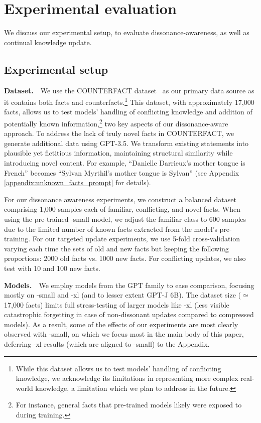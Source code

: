 \section{Experimental evaluation}\label{sec:experiments}
We discuss our experimental setup, to evaluate dissonance-awareness, as well as continual knowledge update.

\subsection{Experimental setup}\label{sec:models_and_data}

\textbf{Dataset.}\ \ 
We use the COUNTERFACT dataset~\citep{meng2022locating} as our primary data source as it contains both facts and counterfacts.\footnote{While this dataset allows us to test models' handling of conflicting knowledge, we acknowledge its limitations in representing more complex real-world knowledge, a limitation which we plan to address in the future.}
This dataset, with approximately 17,000 facts, allows us to test models' handling of conflicting knowledge and addition of potentially known information,\footnote{For instance,  general facts that pre-trained models likely were exposed to during  training.} two key aspects of our dissonance-aware approach. To address the lack of truly novel facts in COUNTERFACT, we generate additional data using GPT-3.5. We transform existing statements into plausible yet fictitious information, maintaining structural similarity while introducing novel content. For example, ``Danielle Darrieux's mother tongue is French'' becomes ``Sylvan Myrthil's mother tongue is Sylvan'' (see Appendix \ref{appendix:unknown_facts_prompt} for details).

For our dissonance awareness experiments, we construct a balanced dataset comprising 1,000 samples each of familiar, conflicting, and novel facts. When using the pre-trained \gpttwo-small model, we adjust the familiar class to 600 samples due to the limited number of known facts extracted from the model's pre-training. 
For our targeted update experiments, we use 5-fold cross-validation varying each time the sets of old and new facts but keeping the following proportions: 2000 old facts vs. 1000 new facts. For conflicting updates, we also test with 10 and 100 new facts. 

\textbf{Models.}\ \ We employ models from the GPT family to ease comparison, focusing mostly on \gpttwo-small and \gpttwo-xl (and to lesser extent GPT-J 6B). The dataset size ($\simeq$17,000 facts) limits full stress-testing of larger models like \gpttwo-xl (less visible  catastrophic forgetting in case of non-dissonant updates compared to compressed models). As a result, some of the effects of our experiments are most clearly observed with \gpttwo-small, on which we focus most in the main body of this paper, deferring \gpttwo-xl results (which are aligned to \gpttwo-small) to the Appendix.

